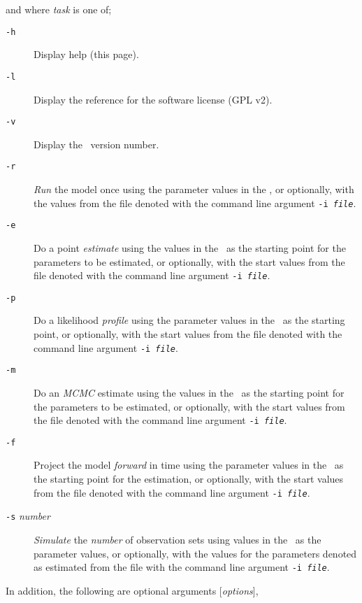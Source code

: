 and where \emph{task} is one of;
\begin{description}
\item [\texttt{-h}] Display help (this page).
\item [\texttt{-l}] Display the reference for the software license (GPL v2).
\item [\texttt{-v}] Display the \CNAME\ version number.

\item [\texttt{-r}] \emph{Run} the model once using the parameter values in the \config, or optionally, with the values from the file denoted with the command line argument \texttt{-i \emph{file}}.

\item [\texttt{-e}] Do a point \emph{estimate} using the values in the \config\ as the starting point for the parameters to be estimated, or optionally, with the start values from the file denoted with the command line argument \texttt{-i \emph{file}}.

\item [\texttt{-p}] Do a likelihood \emph{profile} using the parameter values in the \config\ as the starting point, or optionally, with the start values from the file denoted with the command line argument \texttt{-i \emph{file}}.

\item [\texttt{-m}] Do an \emph{MCMC} estimate using the values in the \config\ as the starting point for the parameters to be estimated, or optionally, with the start values from the file denoted with the command line argument \texttt{-i \emph{file}}. 

\item [\texttt{-f}] Project the model \emph{forward} in time using the parameter values in the \config\ as the starting point for the estimation, or optionally, with the start values from the file denoted with the command line argument \texttt{-i \emph{file}}. 

\item [\texttt{-s} \emph{number}] \emph{Simulate} the \emph{number} of observation sets using values in the \config\ as the parameter values, or optionally, with the values for the parameters denoted as estimated from the file with the command line argument \texttt{-i \emph{file}}.

\end{description}

In addition, the following are optional arguments [\emph{options}],

